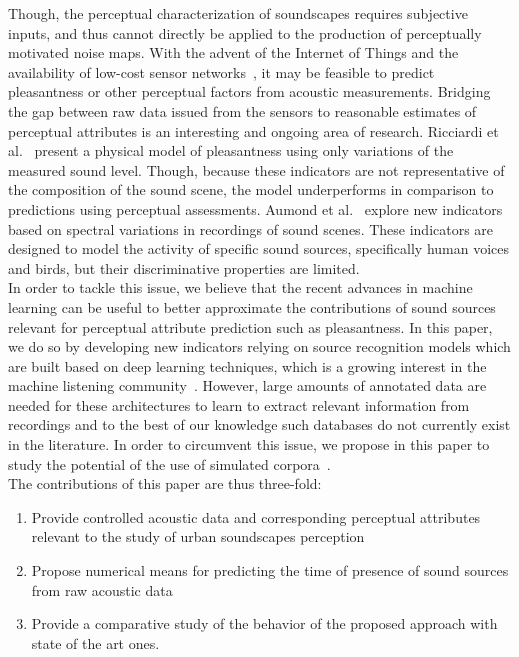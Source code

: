 \documentclass[11pt,a4paper]{article}
\begin{document}
Though, the perceptual characterization of soundscapes requires subjective inputs, and thus cannot directly be applied to the production of perceptually motivated noise maps. With the advent of the Internet of Things and the availability of low-cost sensor networks~\cite{ardouin2018, mydlarz2017}, it may be feasible to predict pleasantness or other perceptual factors from acoustic measurements. Bridging the gap between raw data issued from the sensors to reasonable estimates of perceptual attributes is an interesting and ongoing area of research. Ricciardi et al.~\cite{ricciardi2014} present a physical model of pleasantness using only variations of the measured sound level. Though, because these indicators are not representative of the composition of the sound scene, the model underperforms in comparison to predictions using perceptual assessments. Aumond et al.~\cite{aumond2017} explore new indicators based on spectral variations in recordings of sound scenes. These indicators are designed to model the activity of specific sound sources, specifically human voices and birds, but their discriminative properties are limited.\\

In order to tackle this issue, we believe that the recent advances in machine learning can be useful to better approximate the contributions of sound sources relevant for perceptual attribute prediction such as pleasantness. In this paper, we do so by developing new indicators relying on source recognition models which are built based on deep learning techniques, which is a growing interest in the machine listening community~\cite{cakir2015, salamon2017-2}. However, large amounts of annotated data are needed for these architectures to learn to extract relevant information from recordings and to the best of our knowledge such databases do not currently exist in the literature. In order to circumvent this issue, we propose in this paper to study the potential of the use of simulated corpora~\cite{rossignol2015, salamon2017}.\\

The contributions of this paper are thus three-fold:
\begin{enumerate}
  \item Provide controlled acoustic data and corresponding perceptual attributes relevant to the study of urban soundscapes perception
  \item Propose numerical means for predicting the time of presence of sound sources from raw acoustic data
  \item Provide a comparative study of the behavior of the proposed approach with state of the art ones.
\end{enumerate}
\end{document}

